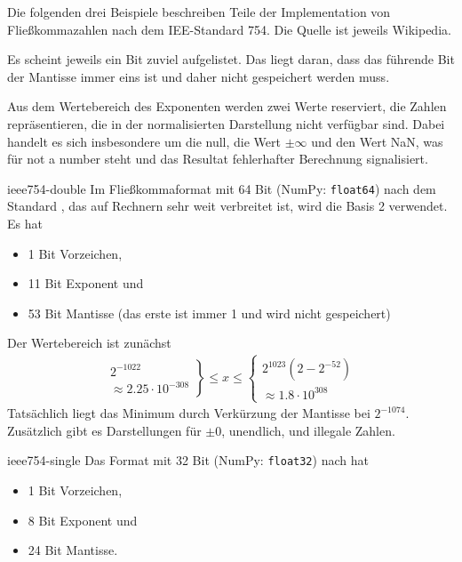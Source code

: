 \begin{intro}
  Die folgenden drei Beispiele beschreiben Teile der Implementation
  von Fließkommazahlen nach dem IEE-Standard 754. Die Quelle ist
  jeweils Wikipedia.
  
  Es scheint jeweils ein Bit zuviel aufgelistet. Das liegt daran, dass das führende Bit der Mantisse immer eins ist und daher nicht gespeichert werden muss.
  
  Aus dem Wertebereich des Exponenten werden zwei Werte reserviert, die Zahlen repräsentieren, die in der normalisierten Darstellung nicht verfügbar sind. Dabei handelt es sich insbesondere um die null, die Wert $\pm\infty$ und den Wert \glqq NaN\grqq{}, was für \glqq not a number\grqq{} steht und das Resultat fehlerhafter Berechnung signalisiert.
\end{intro}
\begin{Beispiel}{ieee754-double}
  Im Fließkommaformat mit 64 Bit (NumPy: \texttt{float64}) nach dem Standard
  , das auf Rechnern sehr weit verbreitet ist, wird
  die Basis 2 verwendet. Es hat
  \begin{itemize}
  \item 1 Bit Vorzeichen,
  \item 11 Bit Exponent und
  \item 53 Bit Mantisse (das erste ist immer 1 und wird nicht gespeichert)
  \end{itemize}
  Der Wertebereich ist zunächst
  \begin{gather}
    \left.
      \begin{matrix}
        2^{-1022} \\ \approx 2.25 \cdot 10^{-308}
      \end{matrix}
    \right\}
    \le x \le
    \left\{
      \begin{matrix}
        2^{1023}(2-2^{-52}) \\
        \approx 1.8 \cdot 10^{308}
      \end{matrix}
    \right.
  \end{gather}
  Tatsächlich liegt das Minimum durch Verkürzung der Mantisse bei
  $2^{-1074}$. Zusätzlich gibt es Darstellungen für $\pm 0$,
  unendlich, und illegale Zahlen.
\end{Beispiel}

\begin{Beispiel}{ieee754-single}
  Das Format mit 32 Bit (NumPy: \texttt{float32}) nach  hat
  \begin{itemize}
  \item 1 Bit Vorzeichen,
  \item 8 Bit Exponent und
  \item 24 Bit Mantisse.
  \end{itemize}
\end{Beispiel}

